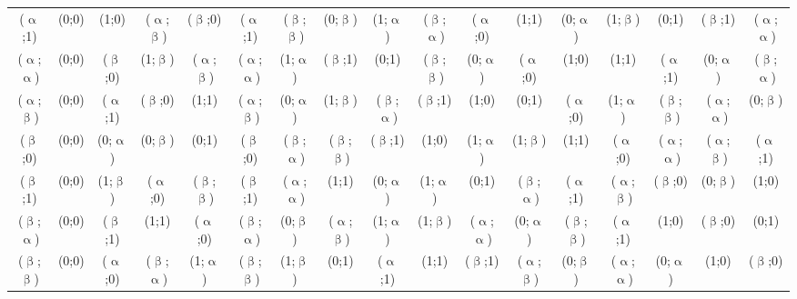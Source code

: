 {\begin{minipage}[c]{0.9\textheight}
\begin{center}
\begin{tabularx}{1.06\linewidth}{c|cccccccccccccccc}
 ($\upalpha$;1) & (0;0) & (1;0) & ($\upalpha$;$\upbeta$) & ($\upbeta$;0) & ($\upalpha$;1) & ($\upbeta$;$\upbeta$) & (0;$\upbeta$) & (1;$\upalpha$) & ($\upbeta$;$\upalpha$) & ($\upalpha$;0) & (1;1) & (0;$\upalpha$) & (1;$\upbeta$) & (0;1) & ($\upbeta$;1) & ($\upalpha$;$\upalpha$) \\
 ($\upalpha$;$\upalpha$) & (0;0) & ($\upbeta$;0) & (1;$\upbeta$) & ($\upalpha$;$\upbeta$) & ($\upalpha$;$\upalpha$) & (1;$\upalpha$) & ($\upbeta$;1) & (0;1) & ($\upbeta$;$\upbeta$) & (0;$\upalpha$) & ($\upalpha$;0) & (1;0) & (1;1) & ($\upalpha$;1) & (0;$\upalpha$) & ($\upbeta$;$\upalpha$) \\
 ($\upalpha$;$\upbeta$) & (0;0) & ($\upalpha$;1) & ($\upbeta$;0) & (1;1) & ($\upalpha$;$\upbeta$) & (0;$\upalpha$) & (1;$\upbeta$) & ($\upbeta$;$\upalpha$) & ($\upbeta$;1) & (1;0) & (0;1) & ($\upalpha$;0) & (1;$\upalpha$) & ($\upbeta$;$\upbeta$) & ($\upalpha$;$\upalpha$) & (0;$\upbeta$) \\
 ($\upbeta$;0) & (0;0) & (0;$\upalpha$) & (0;$\upbeta$) & (0;1) & ($\upbeta$;0) & ($\upbeta$;$\upalpha$) & ($\upbeta$;$\upbeta$) & ($\upbeta$;1) & (1;0) & (1;$\upalpha$) & (1;$\upbeta$) & (1;1) & ($\upalpha$;0) & ($\upalpha$;$\upalpha$) & ($\upalpha$;$\upbeta$) & ($\upalpha$;1) \\
 ($\upbeta$;1) & (0;0) & (1;$\upbeta$) & ($\upalpha$;0) & ($\upbeta$;$\upbeta$) & ($\upbeta$;1) & ($\upalpha$;$\upalpha$) & (1;1) & (0;$\upalpha$) & (1;$\upalpha$) & (0;1) & ($\upbeta$;$\upalpha$) & ($\upalpha$;1) & ($\upalpha$;$\upbeta$) & ($\upbeta$;0) & (0;$\upbeta$) & (1;0) \\
 ($\upbeta$;$\upalpha$) & (0;0) & ($\upbeta$;1) & (1;1) & ($\upalpha$;0) & ($\upbeta$;$\upalpha$) & (0;$\upbeta$) & ($\upalpha$;$\upbeta$) & (1;$\upalpha$) & (1;$\upbeta$) & ($\upalpha$;$\upalpha$) & (0;$\upalpha$) & ($\upbeta$;$\upbeta$) & ($\upalpha$;1) & (1;0) & ($\upbeta$;0) & (0;1) \\
 ($\upbeta$;$\upbeta$) & (0;0) & ($\upalpha$;0) & ($\upbeta$;$\upalpha$) & (1;$\upalpha$) & ($\upbeta$;$\upbeta$) & (1;$\upbeta$) & (0;1) & ($\upalpha$;1) & (1;1) & ($\upbeta$;1) & ($\upalpha$;$\upbeta$) & (0;$\upbeta$) & ($\upalpha$;$\upalpha$) & (0;$\upalpha$) & (1;0) & ($\upbeta$;0)\\
 \bottomrule
 \end{tabularx}
\end{center}
\end{minipage}
}
